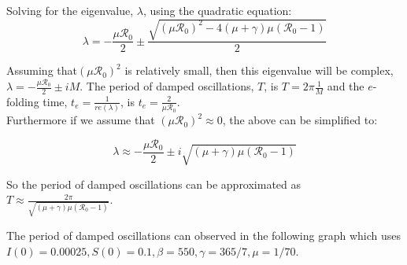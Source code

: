 \documentclass[12pt]{article}\usepackage[]{graphicx}\usepackage[]{color}
\begin{document}
\begin{enumerate}[(a)]
Solving for the eigenvalue, $\lambda$, using the quadratic equation:
\begin{equation}
  \lambda = -\frac{\mu \mathcal R_0}{2} \pm \frac {\sqrt{(\mu \mathcal R_0)^2-4(\mu + \gamma)\mu(\mathcal R_0 - 1)}}{2}
\end{equation}

Assuming that$(\mu \mathcal R_0)^2$ is relatively small, then this eigenvalue will be complex, $\lambda = -\frac{\mu \mathcal R_0}{2} \pm iM$. The period of damped oscillations, $T$, is $T = 2\pi\frac{1}{M}$ and the $e$-folding time, $t_e = \frac{1}{re(\lambda)}$, is $t_e = \frac{2}{\mu \mathcal R_0}$. \\

Furthermore if we assume that $(\mu \mathcal R_0)^2 \approx 0$, the above can be simplified to:

\begin{equation}
  \lambda \approx -\frac{\mu \mathcal R_0}{2} \pm i \sqrt{(\mu + \gamma)\mu(\mathcal R_0 - 1)}
\end{equation}

So the period of damped oscillations can be approximated as $T \approx \frac{2\pi}{\sqrt{(\mu + \gamma)\mu(\mathcal R_0 - 1)}}$. \par

The period of damped oscillations can observed in the following graph which uses $I(0) = 0.00025, S(0) = 0.1, \beta = 550, \gamma=365/7, \mu=1/70$. 


\end{enumerate}
\end{document}
